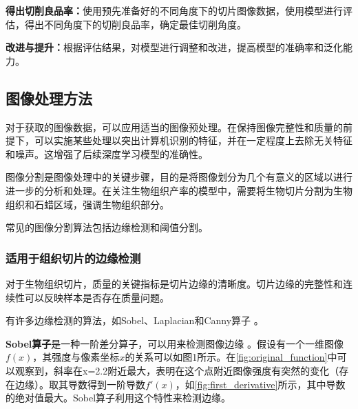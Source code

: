 \textbf{得出切削良品率：}使用预先准备好的不同角度下的切片图像数据，使用模型进行评估，得出不同角度下的切削良品率，确定最佳切削角度。

\textbf{改进与提升：}根据评估结果，对模型进行调整和改进，提高模型的准确率和泛化能力。

\subsection{图像处理方法}

对于获取的图像数据，可以应用适当的图像预处理。在保持图像完整性和质量的前提下，可以实施某些处理以突出计算机识别的特征，并在一定程度上去除无关特征和噪声。这增强了后续深度学习模型的准确性。

图像分割是图像处理中的关键步骤，目的是将图像划分为几个有意义的区域以进行进一步的分析和处理。在关注生物组织产率的模型中，需要将生物切片分割为生物组织和石蜡区域，强调生物组织部分。

常见的图像分割算法包括边缘检测和阈值分割。

\subsubsection{适用于组织切片的边缘检测}
对于生物组织切片，质量的关键指标是切片边缘的清晰度。切片边缘的完整性和连续性可以反映样本是否存在质量问题。

有许多边缘检测的算法，如Sobel、Laplacian和Canny算子 \cite{3.1}。

\textbf{Sobel算子}是一种一阶差分算子，可以用来检测图像边缘 \cite{补充1}。假设有一个一维图像$f(x)$，其强度与像素坐标$x$的关系可以如图1所示。在\autoref{fig:original_function}中可以观察到，斜率在x=2.2附近最大，表明在这个点附近图像强度有突然的变化（存在边缘）。取其导数得到一阶导数$f'(x)$，如\autoref{fig:first_derivative}所示，其中导数的绝对值最大。Sobel算子利用这个特性来检测边缘。

